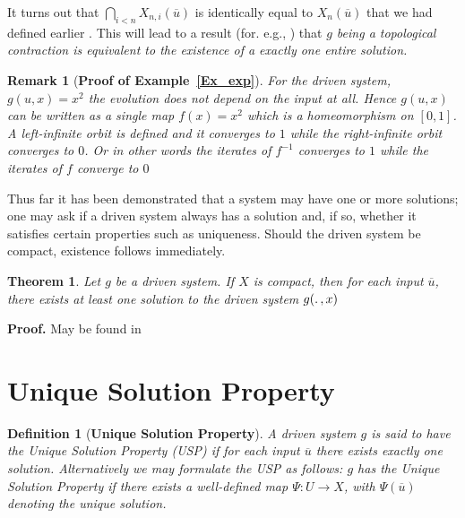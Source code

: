 \documentclass[a4paper,12pt,twoside]{report}
\newtheorem{Definition}{Definition}[]
\newtheorem{Theorem}{Theorem}[]
\newtheorem{Remark}{Remark}[]
\begin{document}
It turns out that $\bigcap_{i<n}X_{n,i}(\overline{u})$ is identically equal to $X_n(\overline{u})$ that we had defined earlier . This will lead to a result (for. e.g., \cite{manjunath2013echo}) that  \textit{$g$ being a topological contraction is equivalent to the existence of a exactly one entire solution.}

\begin{Remark}
  [\bf Proof of Example~\ref{Ex_exp}] \label{rem_proofEx} \rm
  For the driven system,  
  $g(u,x)=x^2$ the evolution does not depend on the input at all. Hence $g(u,x)$ can be written as a single map $f(x)=x^2$ which is a homeomorphism on $[0,1]$. A left-infinite orbit is defined and it converges to $1$ while the right-infinite orbit converges to $0$. Or in other words the iterates of $f^{-1}$ converges to $1$ while the iterates of $f$ converge to $0$ 
\end{Remark}

Thus far it has been demonstrated that a system may have one or more solutions; one may ask if a driven system always has a solution and, if so, whether it satisfies certain properties such as uniqueness. 
Should the driven system be compact, existence follows immediately.

\begin{Theorem}\label{Thm_CompactExistence}
 Let $g$ be a driven system.  If $X$ is compact, then for each input $\overline{u}$, there exists at least one solution to the driven system $g(\ldotp, x)$
\end{Theorem}
{\bf Proof.}  May be found in \cite{kloeden2011nonautonomous, manjunath2014dynamics, manjunath2013echo}



\section{Unique Solution Property}

\begin{Definition}
  [\bf Unique Solution Property] \label{Dfn_usp}\rm
  A driven system $g$ is said to have the Unique Solution Property (USP) if for each input $\overline{u}$ there exists exactly one solution. 
  Alternatively we may formulate the USP as follows: $g$ has the Unique Solution Property if there exists a well-defined map $\Psi:{U}\to{X}$, with $\Psi({\overline{u}})$ denoting the unique solution.
\end{Definition}
\end{document}
